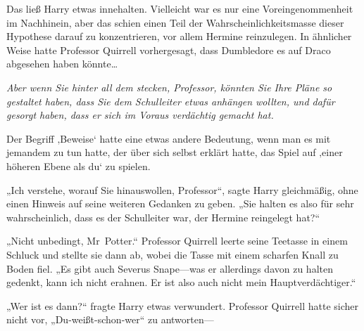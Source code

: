 Das ließ Harry etwas innehalten. Vielleicht war es nur eine Voreingenommenheit im Nachhinein, aber das schien einen Teil der Wahrscheinlichkeitsmasse dieser Hypothese darauf zu konzentrieren, vor allem Hermine reinzulegen. In ähnlicher Weise hatte Professor Quirrell vorhergesagt, dass Dumbledore es auf Draco abgesehen haben könnte…

\emph{Aber wenn Sie hinter all dem stecken, Professor, könnten Sie Ihre Pläne so gestaltet haben, dass Sie dem Schulleiter etwas anhängen wollten, und dafür gesorgt haben, dass er sich im Voraus verdächtig gemacht hat.}

Der Begriff ‚Beweise‘ hatte eine etwas andere Bedeutung, wenn man es mit jemandem zu tun hatte, der über sich selbst erklärt hatte, das Spiel auf ‚einer höheren Ebene als du‘ zu spielen.

„Ich verstehe, worauf Sie hinauswollen, Professor“, sagte Harry gleichmäßig, ohne einen Hinweis auf seine weiteren Gedanken zu geben. „Sie halten es also für sehr wahrscheinlich, dass es der Schulleiter war, der Hermine reingelegt hat?“

„Nicht unbedingt, Mr~Potter.“ Professor Quirrell leerte seine Teetasse in einem Schluck und stellte sie dann ab, wobei die Tasse mit einem scharfen Knall zu Boden fiel. „Es gibt auch Severus Snape—was er allerdings davon zu halten gedenkt, kann ich nicht erahnen. Er ist also auch nicht mein Hauptverdächtiger.“

„Wer ist es dann?“ fragte Harry etwas verwundert. Professor Quirrell hatte sicher nicht vor, „Du-weißt-schon-wer“ zu antworten—

